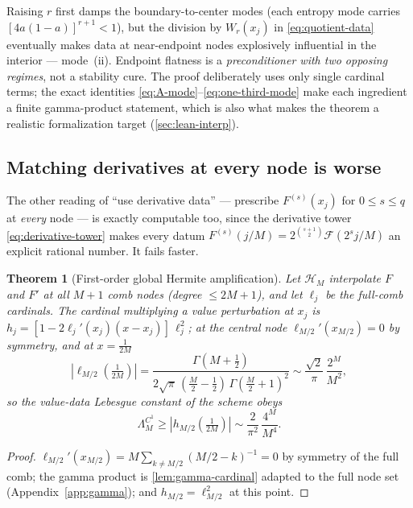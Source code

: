 \documentclass[11pt,oneside]{article}
\numberwithin{equation}{section}
\newtheorem{theorem}{Theorem}[section]
\theoremstyle{definition}
\theoremstyle{remark}
\newcommand{\abs}[1]{\left\lvert #1\right\rvert}
\begin{document}
\begin{remark}
Raising $r$ first damps the boundary-to-center modes (each entropy
mode carries $[4a(1-a)]^{r+1}<1$), but the division by
$W_r(x_j)$ in \eqref{eq:quotient-data} eventually makes data at
near-endpoint nodes explosively influential in the interior ---
mode~(ii).  Endpoint flatness is a \emph{preconditioner with two
opposing regimes}, not a stability cure.  The proof deliberately uses
only single cardinal terms; the exact identities
\eqref{eq:A-mode}--\eqref{eq:one-third-mode} make each ingredient a
finite gamma-product statement, which is also what makes the theorem
a realistic formalization target
(\cref{sec:lean-interp}).
\end{remark}

\subsection{Matching derivatives at every node is worse}
\label{sec:full-hermite}

The other reading of ``use derivative data'' --- prescribe
$F^{(s)}(x_j)$ for $0\le s\le q$ at \emph{every} node --- is exactly
computable too, since the derivative tower \eqref{eq:derivative-tower}
makes every datum $F^{(s)}(j/M)=2^{\binom{s+1}2}
\mathcal F(2^{s}j/M)$ an explicit rational number.  It fails faster.

\begin{theorem}[First-order global Hermite amplification]
\label{thm:global-hermite}
Let $\mathcal H_M$ interpolate $F$ and $F'$ at all $M+1$ comb nodes
(degree $\le2M+1$), and let $\ell_j$ be the full-comb cardinals.  The
cardinal multiplying a value perturbation at $x_j$ is
$h_j=[1-2\ell_j'(x_j)(x-x_j)]\,\ell_j^{2}$; at the central node
$\ell_{M/2}'(x_{M/2})=0$ by symmetry, and at $x=\tfrac1{2M}$
\begin{equation}
 \abs{\ell_{M/2}(\tfrac1{2M})}
 =\frac{\Gamma(M+\tfrac12)}
 {2\sqrt\pi\,(\tfrac M2-\tfrac12)\,\Gamma(\tfrac M2+1)^{2}}
 \sim\frac{\sqrt2}{\pi}\,\frac{2^{M}}{M^{2}},
 \label{eq:full-central-cardinal}
\end{equation}
so the value-data Lebesgue constant of the scheme obeys
\begin{equation}
 \Lambda^{C^{1}}_M
 \ge\abs{h_{M/2}(\tfrac1{2M})}
 \sim\frac{2}{\pi^{2}}\,\frac{4^{M}}{M^{4}}.
 \label{eq:hermite-square}
\end{equation}
\end{theorem}

\begin{proof}
$\ell_{M/2}'(x_{M/2})=M\sum_{k\ne M/2}(M/2-k)^{-1}=0$ by symmetry of
the full comb; the gamma product is \cref{lem:gamma-cardinal} adapted
to the full node set (Appendix~\ref{app:gamma}); and $h_{M/2}=\ell_{M/2}^{2}$
at this point.
\end{proof}
\end{document}

